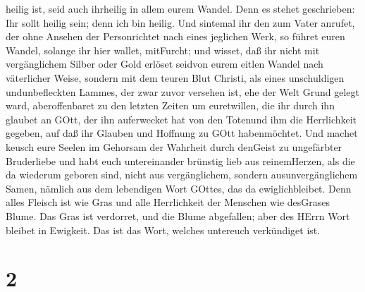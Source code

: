 heilig ist, seid auch ihrheilig in allem eurem Wandel. 
Denn es stehet geschrieben: Ihr sollt heilig sein; denn ich bin heilig.
 Und sintemal ihr den zum Vater anrufet, der ohne Ansehen
der Personrichtet nach eines jeglichen Werk, so führet euren Wandel,
solange ihr hier wallet, mitFurcht;  und wisset, daß ihr
nicht mit vergänglichem Silber oder Gold erlöset seidvon eurem eitlen
Wandel nach väterlicher Weise,  sondern mit dem teuren Blut
Christi, als eines unschuldigen undunbefleckten Lammes, 
der zwar zuvor versehen ist, ehe der Welt Grund gelegt ward,
aberoffenbaret zu den letzten Zeiten um euretwillen,  die
ihr durch ihn glaubet an GOtt, der ihn auferwecket hat von den Totenund
ihm die Herrlichkeit gegeben, auf daß ihr Glauben und Hoffnung zu GOtt
habenmöchtet.  Und machet keusch eure Seelen im Gehorsam
der Wahrheit durch denGeist zu ungefärbter Bruderliebe und habt euch
untereinander brünstig lieb aus reinemHerzen,  als die da
wiederum geboren sind, nicht aus vergänglichem, sondern
ausunvergänglichem Samen, nämlich aus dem lebendigen Wort GOttes, das da
ewiglichbleibet.  Denn alles Fleisch ist wie Gras und alle
Herrlichkeit der Menschen wie desGrases Blume. Das Gras ist verdorret,
und die Blume abgefallen;  aber des HErrn Wort bleibet in
Ewigkeit. Das ist das Wort, welches untereuch verkündiget ist.

\hypertarget{section-1}{%
\section{2}\label{section-1}}

